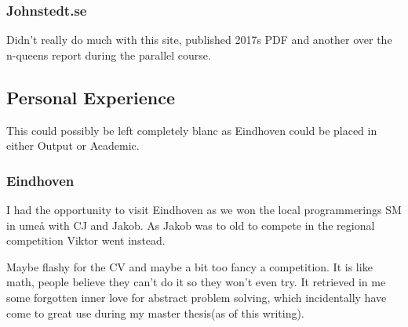 \documentclass[a4paper]{article}
\begin{document}
	\subsubsection{Johnstedt.se}
	
	Didn't really do much with this site, published 2017s PDF and another over the n-queens report during the parallel course.
	
	\subsection{Personal Experience}
	
	This could possibly be left completely blanc as Eindhoven could be placed in either Output or Academic.
	
	\subsubsection{Eindhoven}
	
	I had the opportunity to visit Eindhoven as we won the local programmerings SM in umeå with CJ and Jakob. As Jakob was to old to compete in the regional competition Viktor went instead. 
	
	Maybe flashy for the CV and maybe a bit too fancy a competition. It is like math, people believe they can't do it so they won't even try. It retrieved in me some forgotten inner love for abstract problem solving, which incidentally have come to great use during my master thesis(as of this writing). 
	
\end{document}
